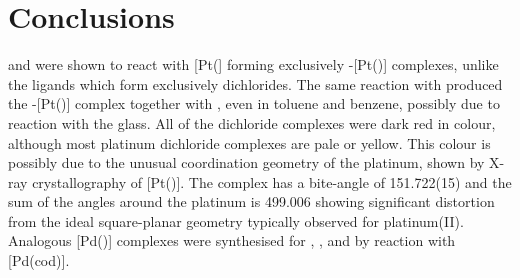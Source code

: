 



\section{Conclusions}

\tBuXantphos{} and \tBuThixantphos{} were shown to react with [Pt(] forming exclusively \trans-[Pt(\tBuxantphos)] complexes, unlike the \Phxantphos{} ligands which form exclusively \cis{} dichlorides.  The same reaction with \tBuSixantphos{} produced the \trans{}-[Pt(\tBusixantphos)] complex together with \tBusixantphos{}, even in toluene and benzene, possibly due to reaction with the glass.  All of the dichloride complexes were dark red in colour, although most platinum dichloride complexes are pale or yellow.  This colour is possibly due to the unusual coordination geometry of the platinum, shown by X-ray crystallography of [Pt(\tButhixantphos)].  The complex has a bite-angle of 151.722(15)\degrees{} and the sum of the angles around the platinum is 499.006\degrees{} showing significant distortion from the ideal square-planar geometry typically observed for platinum(II).  Analogous [Pd(\tBuxantphos)] complexes were synthesised for \tBusixantphos, \tButhixantphos, and \tBuxantphos{} by reaction with [Pd(cod)].  


